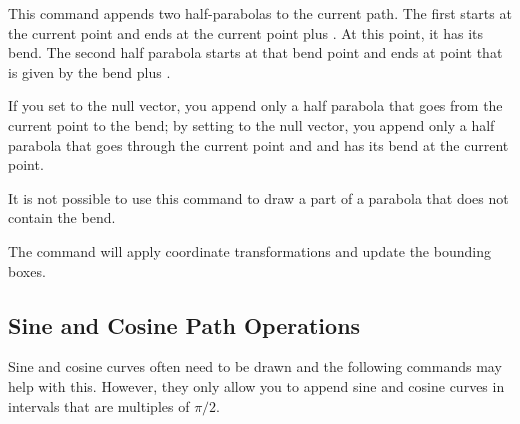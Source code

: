 \begin{command}{\pgfpathparabola{}}
  This command appends two half-parabolas to the  current path. The
  first starts at the current point and ends at the current point plus
  . At this point, it has its bend. The second half
  parabola starts at that bend point and ends at point that is given by
  the bend plus .

  If you set  to the null vector, you append only a
  half parabola that goes from the current point to the bend; by
  setting  to the null vector, you append only a
  half parabola that goes through the current point and  and
  has its bend at the current point.

  It is not possible to use this command to draw a part of a parabola
  that does not contain the bend.

\begin{codeexample}[]
\begin{pgfpicture}
  \pgfpathmoveto{\pgfpointorigin}
  \pgfpathparabola{\pgfpointorigin}{\pgfpoint{2cm}{4cm}}
  \color{red}

  \pgfpathmoveto{\pgfpointorigin}
  \pgfpathparabola{\pgfpoint{-2cm}{4cm}}{\pgfpointorigin}
  \color{blue}

  \pgfpathmoveto{\pgfpoint{-2cm}{2cm}}
  \pgfpathparabola{\pgfpoint{1cm}{-1cm}}{\pgfpoint{2cm}{4cm}}
  \color{orange}
\end{pgfpicture}
\end{codeexample}
  The command will apply coordinate transformations and update the
  bounding boxes.
\end{command}


\subsection{Sine and Cosine Path Operations}

Sine and cosine curves often need to be drawn and the following commands
may help with this. However, they only allow you to append sine and
cosine curves in intervals that are multiples of $\pi/2$.

